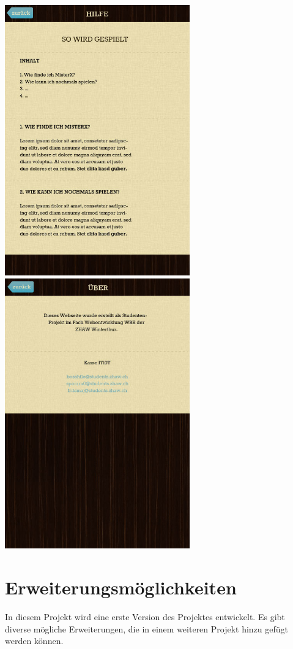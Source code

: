 \documentclass[11pt]{article}
\begin{document}
\includegraphics[width=8cm]{Bilder/hilfeView.jpg}
\includegraphics[width=8cm]{Bilder/ueberView.jpg}

\section{Erweiterungsmöglichkeiten}
In diesem Projekt wird eine erste Version des Projektes entwickelt. Es gibt diverse mögliche Erweiterungen, die in einem weiteren Projekt hinzu gefügt werden können. 
\end{document}
